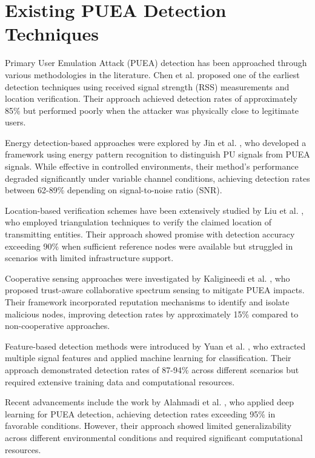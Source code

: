 \section{Existing PUEA Detection Techniques}

Primary User Emulation Attack (PUEA) detection has been approached through various methodologies in the literature. Chen et al. \cite{chen2008defense} proposed one of the earliest detection techniques using received signal strength (RSS) measurements and location verification. Their approach achieved detection rates of approximately 85\% but performed poorly when the attacker was physically close to legitimate users.

Energy detection-based approaches were explored by Jin et al. \cite{jin2010advanced}, who developed a framework using energy pattern recognition to distinguish PU signals from PUEA signals. While effective in controlled environments, their method's performance degraded significantly under variable channel conditions, achieving detection rates between 62-89\% depending on signal-to-noise ratio (SNR).

Location-based verification schemes have been extensively studied by Liu et al. \cite{liu2012location}, who employed triangulation techniques to verify the claimed location of transmitting entities. Their approach showed promise with detection accuracy exceeding 90\% when sufficient reference nodes were available but struggled in scenarios with limited infrastructure support.

Cooperative sensing approaches were investigated by Kaligineedi et al. \cite{kaligineedi2010secure}, who proposed trust-aware collaborative spectrum sensing to mitigate PUEA impacts. Their framework incorporated reputation mechanisms to identify and isolate malicious nodes, improving detection rates by approximately 15\% compared to non-cooperative approaches.

Feature-based detection methods were introduced by Yuan et al. \cite{yuan2012machine}, who extracted multiple signal features and applied machine learning for classification. Their approach demonstrated detection rates of 87-94\% across different scenarios but required extensive training data and computational resources.

Recent advancements include the work by Alahmadi et al. \cite{alahmadi2020deep}, who applied deep learning for PUEA detection, achieving detection rates exceeding 95\% in favorable conditions. However, their approach showed limited generalizability across different environmental conditions and required significant computational resources.

